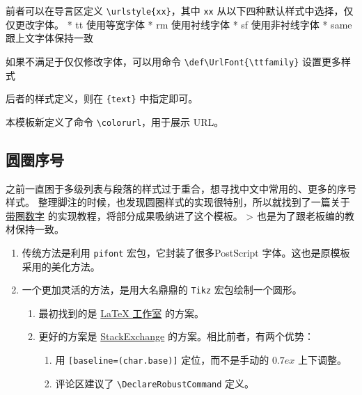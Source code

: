 \documentclass[../Main/thesis.tex]{subfiles}
\begin{document}
前者可以在导言区定义 \texttt{\textbackslash{}urlstyle\{xx\}}，其中
\texttt{xx} 从以下四种默认样式中选择，仅仅更改字体。 * tt 使用等宽字体 *
rm 使用衬线字体 * sf 使用非衬线字体 * same 跟上文字体保持一致

如果不满足于仅仅修改字体，可以用命令
\texttt{\textbackslash{}def\textbackslash{}UrlFont\{\textbackslash{}ttfamily\}}
设置更多样式

后者的样式定义，则在 \texttt{\{text\}} 中指定即可。

本模板新定义了命令 \texttt{\textbackslash{}colorurl}，用于展示 URL。



\subsection{圆圈序号}

之前一直困于多级列表与段落的样式过于重合，想寻找中文中常用的、更多的序号样式。
整理脚注的时候，也发现圆圈样式的实现很特别，所以就找到了一篇关于
\href{https://stone-zeng.github.io/2019-02-09-circled-numbers/}{带圈数字}
的实现教程，将部分成果吸纳进了这个模板。 \textgreater{}
也是为了跟老板编的教材保持一致。

\begin{enumerate}
\item
  传统方法是利用 \texttt{pifont} 宏包，它封装了很多PostScript
  字体。这也是原模板采用的美化方法。
\item
  一个更加灵活的方法，是用大名鼎鼎的 \texttt{Tikz} 宏包绘制一个圆形。

  \begin{enumerate}
  \def\labelenumii{\arabic{enumii}.}
  \item
    最初找到的是
    \href{https://www.latexstudio.net/archives/1571.html}{LaTeX 工作室}
    的方案。
  \item
    更好的方案是
    \href{https://tex.stackexchange.com/questions/7032/good-way-to-make-textcircled-numbers\#}{StackExchange}
    的方案。相比前者，有两个优势：

    \begin{enumerate}
    \def\labelenumiii{\arabic{enumiii}.}
    \item
      用 \texttt{[baseline=(char.base)]} 定位，而不是手动的
      \(0.7ex\) 上下调整。
    \item
      评论区建议了 \texttt{\textbackslash{}DeclareRobustCommand} 定义。
    \end{enumerate}
  \end{enumerate}
\end{enumerate}
\end{document}
